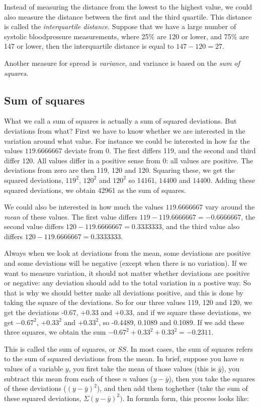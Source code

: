 \documentclass[]{report}\usepackage[]{graphicx}\usepackage[]{color}
\begin{document}
Instead of measuring the distance from the lowest to the highest value, we could also measure the distance between the first and the third quartile. This distance is called the \textit{interquartile distance}. Suppose that we have a large number of systolic bloodpressure measurements, where 25\% are 120 or lower, and 75\% are 147 or lower, then the interquartile distance is equal to $147-120=27$. 

Another measure for spread is \textit{variance}, and variance is based on the \textit{sum of squares}. 

\subsection{Sum of squares}

What we call a sum of squares is actually a sum of squared deviations. But deviations from what? First we have to know whether we are interested in the variation around what value. For instance we could be interested in how far the values $119.6666667$ deviate from 0. The first differs 119, and the second and third differ 120. All values differ in a positive sense from 0: all values are positive. The deviations from zero are then 119, 120 and 120. Squaring these, we get the squared deviations, $119^2$, $120^2$ and $120^2$ so $14161$, $ 14400$ and $ 14400$. Adding these squared deviations, we obtain 42961 as the sum of squares. 

We could also be interested in how much the values $119.6666667$ vary around the \textit{mean} of these values. The first value differs $119-119.6666667= -0.6666667$, the second value differs $120-119.6666667= 0.3333333$, and the third value also differs $120-119.6666667= 0.3333333$.

Always when we look at deviations from the mean, some deviations are positive and some deviations will be negative (except when there is no variation). If we want to measure variation, it should not matter whether deviations are positive or negative: any deviation should add to the total variation in a postive way. So that is why we should better make all deviations positive, and this is done by taking the square of the deviations. So for our three values 119, 120 and 120, we get the deviations -0.67, +0.33 and +0.33, and if we square these deviations, we get $-0.67^2$, $+0.33^2$ and $+0.33^2$, so -0.4489, 0.1089 and 0.1089. If we add these three squares, we obtain the sum $-0.67^2+0.33^2+0.33^2=-0.2311$.   

This is called the sum of squares, or $SS$. In most cases, the sum of squares refers to the sum of squared deviations from the mean. In brief, suppose you have $n$ values of a variable $y$, you first take the mean of those values (this is $\bar{y}$), you subtract this mean from each of these $n$ values ($y-\bar{y}$), then you take the squares of these deviations ($(y-\bar{y})^2$), and then add them toghether (take the sum of these squared deviations, $\Sigma (y-\bar{y})^2)$. In formula form, this process looks like:
\end{document}
